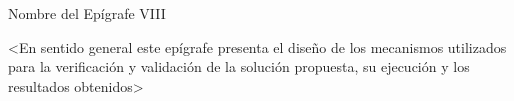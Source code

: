 \epigraph{Nombre del Epígrafe VIII}{%
<En sentido general este epígrafe presenta el diseño de los mecanismos utilizados para la verificación y validación de la solución propuesta, su ejecución y los resultados obtenidos>
}
